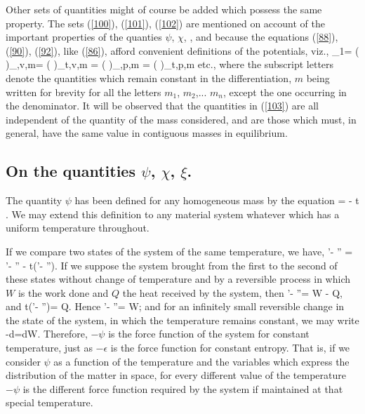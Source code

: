 \documentclass[12pt]{article}
\begin{document}
Other sets of quantities might of course be added which possess the same property. The sets (\ref{100}), (\ref{101}), (\ref{102}) are mentioned on account of the important properties of the quanties $\psi$, $\chi$,  , and because the equations (\ref{88}), (\ref{90}), (\ref{92}), like (\ref{86}), afford convenient definitions of the potentials, viz.,
\eqs \mu_1= \left(  \right)_{\eta,v,m}= 
\left(  \right)_{t,v,m} = 
\left(  \right)_{\eta,p,m} = 
\left(  \right)_{t,p,m}  
\label{104}\eqe
etc., where the subscript letters denote the quantities which remain constant in the differentiation, $m$ being written for brevity for all the letters $m_1$, $m_2$,... $m_n$, except the one occurring in the denominator. It will be observed that the quantities in (\ref{103}) are all independent of the quantity of the mass considered, and are those which must, in general, have the same value in contiguous masses in equilibrium.

\subsection{On the quantities $\psi$, $\chi$, $\xi$.}
The quantity $\psi$ has been defined for any homogeneous mass by the
equation
\eqs \psi = \epsilon - t \eta. \label{105}\eqe
We may extend this definition to any material system whatever which has a uniform temperature throughout.

If we compare two states of the system of the same temperature, we have, 
\eqs \psi'- \psi'' = \epsilon'- \epsilon'' - t(\eta'- \eta''). \label{106}\eqe
If we suppose the system brought from the first to the second of these states without change of temperature and by a reversible process in which $W$ is the work done and $Q$ the heat received by the system, then
\eqs \epsilon'- \epsilon''= W - Q, \label{107}\eqe
and   \eqs         t(\eta'- \eta'')= Q. \label{108}\eqe
Hence  \eqs         \psi'- \psi''= W;  \label{109}\eqe
and for an infinitely small reversible change in the state of the system, in which the temperature remains constant, we may write
\eqs -d\psi=dW. \label{110}\eqe
Therefore, $-\psi$  is the force function of the system for constant temperature, just as $-\epsilon$ is the force function for constant entropy. That is, if we consider $\psi$ as a function of the temperature and the variables which express the distribution of the matter in space, for every different value of the temperature $-\psi$ is the different force function required by the system if maintained at that special temperature.
\end{document}
